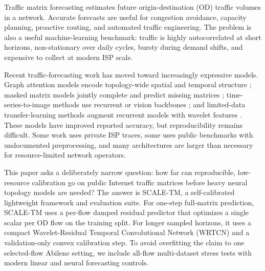 \documentclass{article}
\begin{document}
Traffic matrix forecasting estimates future origin-destination (OD) traffic volumes in a network. Accurate forecasts are useful for congestion avoidance, capacity planning, proactive routing, and automated traffic engineering. The problem is also a useful machine-learning benchmark: traffic is highly autocorrelated at short horizons, non-stationary over daily cycles, bursty during demand shifts, and expensive to collect at modern ISP scale.

Recent traffic-forecasting work has moved toward increasingly expressive models. Graph attention models encode topology-wide spatial and temporal structure \citep{peng2024astgn}; masked matrix models jointly complete and predict missing matrices \citep{zheng2024masked}; time-series-to-image methods use recurrent or vision backbones \citep{kablaoui2024images}; and limited-data transfer-learning methods augment recurrent models with wavelet features \citep{saha2025limited}. These models have improved reported accuracy, but reproducibility remains difficult. Some work uses private ISP traces, some uses public benchmarks with undocumented preprocessing, and many architectures are larger than necessary for resource-limited network operators.

This paper asks a deliberately narrow question: how far can reproducible, low-resource calibration go on public Internet traffic matrices before heavy neural topology models are needed? The answer is SCALE-TM, a self-calibrated lightweight framework and evaluation suite. For one-step full-matrix prediction, SCALE-TM uses a per-flow damped residual predictor that optimizes a single scalar per OD flow on the training split. For longer sampled horizons, it uses a compact Wavelet-Residual Temporal Convolutional Network (WRTCN) and a validation-only convex calibration step. To avoid overfitting the claim to one selected-flow Abilene setting, we include all-flow multi-dataset stress tests with modern linear and neural forecasting controls.
\end{document}
